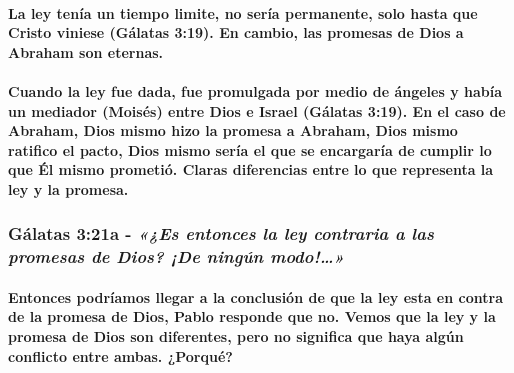 \documentclass[11a pt,twoside]{article}
\newcommand{\scripture}[1]{%
  {\fontsize{12pt}{16pt}\selectfont\ScriptureFont\itshape #1}%
}
\let\oldsubsubsection\subsubsection
\renewcommand{\subsubsection}{\needspace{4\baselineskip}\oldsubsubsection}
\let\oldparagraph\paragraph
\renewcommand{\paragraph}{\needspace{3\baselineskip}\oldparagraph}
\begin{document}
\paragraph{La ley tenía un tiempo limite, no sería permanente, solo
hasta que Cristo viniese (Gálatas 3:19). En cambio, las promesas de Dios
a Abraham son
eternas.}\label{la-ley-tenuxeda-un-tiempo-limite-no-seruxeda-permanente-solo-hasta-que-cristo-viniese-guxe1latas-319.-en-cambio-las-promesas-de-dios-a-abraham-son-eternas.}

\paragraph{Cuando la ley fue dada, fue promulgada por medio de ángeles y
había un mediador (Moisés) entre Dios e Israel (Gálatas 3:19). En el
caso de Abraham, Dios mismo hizo la promesa a Abraham, Dios mismo
ratifico el pacto, Dios mismo sería el que se encargaría de cumplir lo
que Él mismo prometió. Claras diferencias entre lo que representa la ley
y la
promesa.}\label{cuando-la-ley-fue-dada-fue-promulgada-por-medio-de-uxe1ngeles-y-habuxeda-un-mediador-moisuxe9s-entre-dios-e-israel-guxe1latas-319.-en-el-caso-de-abraham-dios-mismo-hizo-la-promesa-a-abraham-dios-mismo-ratifico-el-pacto-dios-mismo-seruxeda-el-que-se-encargaruxeda-de-cumplir-lo-que-uxe9l-mismo-prometiuxf3.-claras-diferencias-entre-lo-que-representa-la-ley-y-la-promesa.}

\subsubsection{\texorpdfstring{Gálatas 3:21a -
\scripture{«¿Es entonces la ley contraria a las promesas de Dios? ¡De ningún modo!…»}}{Gálatas 3:21a - }}\label{guxe1latas-321a---es-entonces-la-ley-contraria-a-las-promesas-de-dios-de-ninguxfan-modo}

\paragraph{Entonces podríamos llegar a la conclusión de que la ley esta
en contra de la promesa de Dios, Pablo responde que no. Vemos que la ley
y la promesa de Dios son diferentes, pero no significa que haya algún
conflicto entre ambas.
¿Porqué?}\label{entonces-podruxedamos-llegar-a-la-conclusiuxf3n-de-que-la-ley-esta-en-contra-de-la-promesa-de-dios-pablo-responde-que-no.-vemos-que-la-ley-y-la-promesa-de-dios-son-diferentes-pero-no-significa-que-haya-alguxfan-conflicto-entre-ambas.-porquuxe9}
\end{document}
